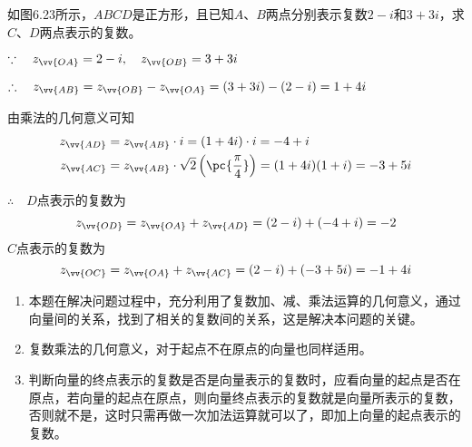 \begin{example}
如图6.23所示，$ABCD$是正方形，且已知$A$、$B$两点分别表示复数$2-i$和$3+3i$，求$C$、$D$两点表示的复数。
\end{example}

\begin{figure}[htp]
    \centering
{}
    \caption{}
\end{figure}

\begin{solution}
$\because\quad z_{\vv{OA}}=2-i,\quad z_{\vv{OB}}=3+3i$

$\therefore\quad z_{\vv{AB}}=z_{\vv{OB}}-z_{\vv{OA}}=(3+3i)-(2-i)=1+4i$

由乘法的几何意义可知
\[\begin{split}
z_{\vv{AD}}&=z_{\vv{AB}}\cdot i=(1+4i)\cdot i =-4+i\\
z_{\vv{AC}}&=z_{\vv{AB}}\cdot \sqrt{2}\left(\pc{\frac{\pi}{4}}\right)=(1+4i)(1+i)=-3+5i
\end{split}\]

$\therefore\quad D$点表示的复数为
\[z_{\vv{OD}}=z_{\vv{OA}}+z_{\vv{AD}}=(2-i)+(-4+i)=-2\]
$C$点表示的复数为
\[z_{\vv{OC}}=z_{\vv{OA}}+z_{\vv{AC}}=(2-i)+(-3+5i)=-1+4i\]
\end{solution}

\begin{rmk}
\begin{enumerate}[(1)]
\item 本题在解决问题过程中，充分利用了复数加、减、乘法运算的几何意义，通过向量间的关系，找到了相关的复数间的关系，这是解决本问题的关键。
\item 复数乘法的几何意义，对于起点不在原点的向量也同样适用。
\item 判断向量的终点表示的复数是否是向量表示的复数时，应看向量的起点是否在原点，若向量的起点在原点，则向量终点表示的复数就是向量所表示的复数，否则就不是，这时只需再做一次加法运算就可以了，即加上向量的起点表示的复数。
\end{enumerate}
\end{rmk}

